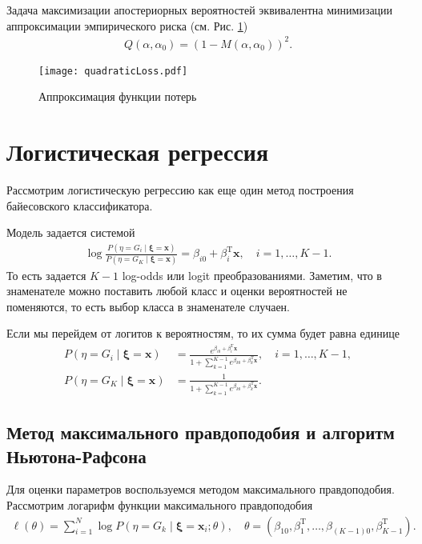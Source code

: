 \documentclass{article}
\begin{document}
Задача максимизации апостериорных вероятностей эквивалентна минимизации аппроксимации эмпирического риска (см. Рис. \ref{fig:quadraticLoss})
\begin{align*}
  Q(\alpha, \alpha_0) = (1 - M(\alpha, \alpha_0))^2.
\end{align*}



\begin{figure}[h]

  \begin{center}
  \texttt{[image: quadraticLoss.pdf]}
\end{center}
  \caption{Аппроксимация функции потерь}
  \label{fig:quadraticLoss}
\end{figure}

\section{Логистическая регрессия}
Рассмотрим логистическую регрессию как еще один метод построения байесовского классификатора.

Модель задается системой
\begin{align*}
  \log\frac{P(\eta = G_i \mid \boldsymbol{\xi} = \mathbf{x})}{P(\eta = G_K \mid \boldsymbol{\xi} = \mathbf{x})} = \beta_{i0} + \beta_{i}^\mathrm{T}\mathbf{x}, \quad i = 1,\ldots, K - 1.
\end{align*}
То есть задается $K-1$ log-odds или logit преобразованиями. Заметим, что в знаменателе можно поставить любой класс и оценки вероятностей не поменяются, то есть выбор класса в знаменателе случаен.

Если мы перейдем от логитов к вероятностям, то их сумма будет равна единице
\begin{align*}
  P(\eta = G_i \mid \boldsymbol{\xi} = \mathbf{x}) &= \frac{e^{\beta_{i0} + \beta^\mathrm{T}_i \mathbf{x}}}{1 + \sum_{k = 1}^{K - 1}e^{\beta_{k0} + \beta^\mathrm{T}_k \mathbf{x}}}, \quad i = 1,\ldots, K - 1,\\
  P(\eta = G_K \mid \boldsymbol{\xi} = \mathbf{x}) &= \frac{1}{1 + \sum_{k = 1}^{K - 1}e^{\beta_{k0} + \beta^\mathrm{T}_k \mathbf{x}}}.
\end{align*}

\subsection{Метод максимального правдоподобия и алгоритм Ньютона-Рафсона}
Для оценки параметров воспользуемся методом максимального правдоподобия. Рассмотрим логарифм функции максимального правдоподобия
\begin{align*}
  \ell(\theta) = \sum_{i = 1}^{N} \log P(\eta = G_k \mid \boldsymbol{\xi} = \mathbf{x}_i; \theta), \quad \theta = (\beta_{10}, \beta_{1}^\mathrm{T},\ldots,\beta_{(K-1)0}, \beta_{K - 1}^\mathrm{T}).
\end{align*}
\end{document}
